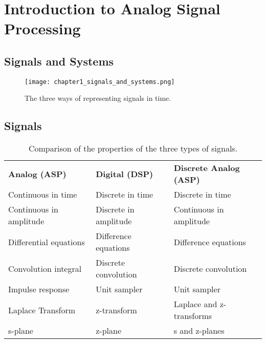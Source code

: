 \documentclass[11pt,fleqn]{book} %
\begin{document}

\pagestyle{empty} %

\tableofcontents %

\cleardoublepage %

\pagestyle{fancy} %



\chapter{Introduction to Analog Signal Processing}

\section{Signals and Systems}

\begin{figure}[h]
  \centering\texttt{[image: chapter1\_signals\_and\_systems.png]}
  \caption{The three ways of representing signals in  time.}
\end{figure}


\section{Signals}

\begin{table}[h]
  \centering
  \begin{tabular}{l|l|l}
    \textbf{Analog (ASP)} & \textbf{Digital (DSP)} & \textbf{Discrete Analog (ASP)}\\
    Continuous in time & Discrete in time & Discrete in time \\
    Continuous in amplitude & Discrete in amplitude & Continuous in amplitude \\
    Differential equations & Difference equations & Difference equations \\
    Convolution integral & Discrete convolution & Discrete convolution \\
    Impulse response & Unit sampler & Unit sampler \\
    Laplace Transform & z-transform & Laplace and z-transforms \\
    s-plane & z-plane & s and z-planes\\
  \end{tabular}
  \caption{Comparison of the properties of the three types of signals.}
\end{table}
\end{document}

